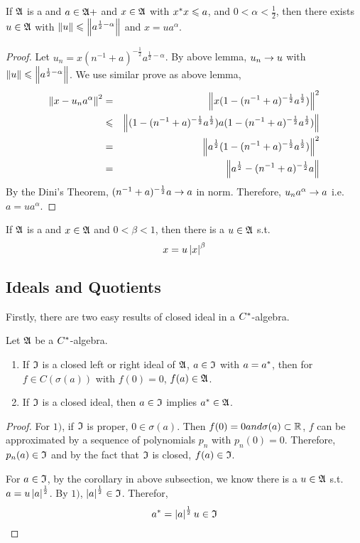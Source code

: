\documentclass[a4paper,11pt]{report}
\begin{document}
\begin{prop}
	If $\mathfrak{A}$ is a \Cs and $a \in \mathfrak{A}{+}$ and $x \in \mathfrak{A}$ with $x^{*}x \leqslant a$, and $0<\alpha<\frac{1}{2}$, then there exists $u \in \mathfrak{A}$ with $\left\lVert u\right\lVert \leqslant \left\lVert a^{\frac{1}{2}-\alpha}\right\lVert$ and $x=ua^{\alpha}$.
\end{prop}
\begin{proof}
	Let $u_n=x(n^{-1}+a)^{-\frac{1}{2}}a^{\frac{1}{2}-\alpha}$. By above lemma, $u_n \rightarrow u$ with $\left\lVert u\right\lVert \leqslant \left\lVert a^{\frac{1}{2}-\alpha}\right\lVert$. We use similar prove as above lemma, 
	\begin{eqnarray*}
		\left\lVert x-u_na^{\alpha}\right\lVert^2 &=& \left\lVert x(1-(n^{-1}+a)^{-\frac{1}{2}}a^{\frac{1}{2}})\right\lVert^2 \\
		&\leqslant& \left\lVert(1-(n^{-1}+a)^{-\frac{1}{2}}a^{\frac{1}{2}})a(1-(n^{-1}+a)^{-\frac{1}{2}}a^{\frac{1}{2}})\right\lVert \\ 
		&=& \left\lVert a^{\frac{1}{2}}(1-(n^{-1}+a)^{-\frac{1}{2}}a^{\frac{1}{2}})\right\lVert^2 \\
		&=& \left\lVert a^{\frac{1}{2}}-(n^{-1}+a)^{-\frac{1}{2}}a\right\lVert
	\end{eqnarray*}
	By the Dini's Theorem, $(n^{-1}+a)^{-\frac{1}{2}}a \rightarrow a$ in norm. Therefore, $u_na^{\alpha} \rightarrow a$ i.e. $a = ua^{\alpha}$.
\end{proof}
\begin{cor}
	If $\mathfrak{A}$ is a \Cs and $x \in \mathfrak{A}$ and $0 < \beta <1$, then there is a $u \in \mathfrak{A}$ s.t.
	\begin{equation*}
		x = u\left\lvert x\right\lvert^{\beta}	
	\end{equation*}
\end{cor}

\subsection{Ideals and Quotients}

Firstly, there are two easy results of closed ideal in a $C^{*}$-algebra.

\begin{prop} \label{prop12}
	Let $\mathfrak{A}$ be a $C^{*}$-algebra.
	\begin{enumerate}[label=\arabic*)]
		\item If $\mathfrak{I}$ is a closed left or right ideal of $\mathfrak{A}$, $a \in \mathfrak{I}$ with $a=a^{*}$, then for $f \in C(\sigma(a))$ with $f(0)=0$, $f(a) \in \mathfrak{A}$.
		\item If $\mathfrak{I}$ is a closed ideal, then $a \in \mathfrak{I}$ implies $a^{*} \in \mathfrak{A}$.
	\end{enumerate}
\end{prop}
\begin{proof}
	For $1)$, if $\mathfrak{I}$ is proper, $0 \in \sigma(a)$. Then $f(0) = 0 and \sigma(a) \subset \mathbb{R}$, $f$ can be approximated by a sequence of polynomials $p_n$ with $p_n(0) = 0$. Therefore, $p_n(a) \in \mathfrak{I}$ and by the fact that $\mathfrak{I}$ is closed, $f(a) \in \mathfrak{I}$.
	\item For $a \in \mathfrak{I}$, by the corollary in above subsection, we know there is a $u \in \mathfrak{A}$ s.t. $a=u\left\lvert a\right\lvert^{\frac{1}{2}}$. By $1)$, $\left\lvert a\right\lvert^{\frac{1}{2}} \in \mathfrak{I}$. Therefor,
	\begin{equation*}
		a^{*} = \left\lvert a\right\lvert^{\frac{1}{2}} u \in \mathfrak{I} \qedhere
	\end{equation*}
\end{proof}
\end{document}
